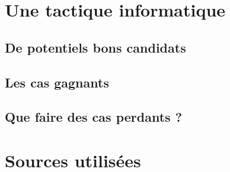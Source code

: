 \documentclass[12pt]{amsart}
\newcommand\contentdir{\jobname}
\begin{document}





\section{Une tactique informatique}

\subsection{De potentiels bons candidats} \label{algo-select}




\subsection{Les cas gagnants} \label{algo-OK}




\subsection{Que faire des cas perdants ?} \label{algo-KO}










\section{Sources utilisées} \label{sources}






%
%
%
%
\end{document}
